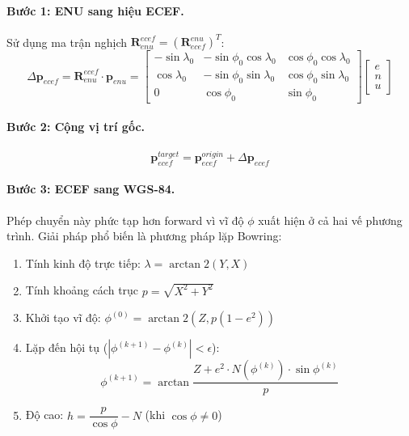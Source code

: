 \paragraph{Bước 1: ENU sang hiệu ECEF.\\} Sử dụng ma trận nghịch $\mathbf{R}_{enu}^{ecef} = (\mathbf{R}_{ecef}^{enu})^T$:
\begin{equation}
    \Delta\mathbf{p}_{ecef} = \mathbf{R}_{enu}^{ecef} \cdot \mathbf{p}_{enu} = \begin{bmatrix}
        -\sin\lambda_0 & -\sin\phi_0\cos\lambda_0 & \cos\phi_0\cos\lambda_0 \\
        \cos\lambda_0 & -\sin\phi_0\sin\lambda_0 & \cos\phi_0\sin\lambda_0 \\
        0 & \cos\phi_0 & \sin\phi_0
    \end{bmatrix} \begin{bmatrix} e \\ n \\ u \end{bmatrix}
\end{equation}

\paragraph{Bước 2: Cộng vị trí gốc.\\}
\begin{equation}
    \mathbf{p}_{ecef}^{target} = \mathbf{p}_{ecef}^{origin} + \Delta\mathbf{p}_{ecef}
\end{equation}

\paragraph{Bước 3: ECEF sang WGS-84.\\} Phép chuyển này phức tạp hơn forward vì vĩ độ $\phi$ xuất hiện ở cả hai vế phương trình. Giải pháp phổ biến là phương pháp lặp Bowring:
\begin{enumerate}
    \item Tính kinh độ trực tiếp: $\lambda = \arctan2(Y, X)$
    \item Tính khoảng cách trục $p = \sqrt{X^2 + Y^2}$
    \item Khởi tạo vĩ độ: $\phi^{(0)} = \arctan2\left(Z, p(1 - e^2)\right)$
    \item Lặp đến hội tụ ($|\phi^{(k+1)} - \phi^{(k)}| < \epsilon$):
    \begin{equation}
        \phi^{(k+1)} = \arctan\frac{Z + e^2 \cdot N(\phi^{(k)}) \cdot \sin\phi^{(k)}}{p}
    \end{equation}
    \item Độ cao: $h = \dfrac{p}{\cos\phi} - N$ (khi $\cos\phi \neq 0$)
\end{enumerate}

